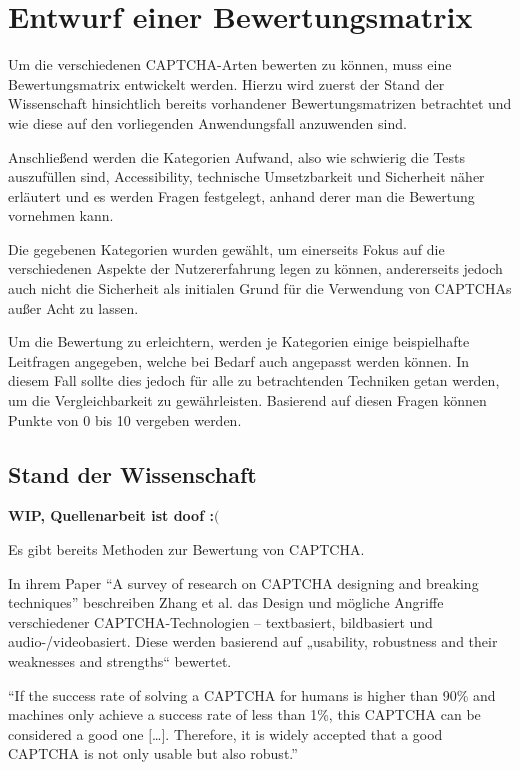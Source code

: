 \chapter{Entwurf einer Bewertungsmatrix}
\label{ch:matrix}

Um die verschiedenen CAPTCHA-Arten bewerten zu können, muss eine Bewertungsmatrix entwickelt werden.
Hierzu wird zuerst der Stand der Wissenschaft hinsichtlich bereits vorhandener Bewertungsmatrizen betrachtet
und wie diese auf den vorliegenden Anwendungsfall anzuwenden sind.

Anschließend werden die Kategorien Aufwand, also wie schwierig die Tests auszufüllen sind, Accessibility, technische Umsetzbarkeit
und Sicherheit näher erläutert und es werden Fragen festgelegt, anhand derer man die Bewertung vornehmen kann.

Die gegebenen Kategorien wurden gewählt, um einerseits Fokus auf die verschiedenen Aspekte der Nutzererfahrung legen zu können,
andererseits jedoch auch nicht die Sicherheit als initialen Grund für die Verwendung von CAPTCHAs außer Acht zu lassen.

Um die Bewertung zu erleichtern, werden je Kategorien einige beispielhafte Leitfragen angegeben, welche bei Bedarf auch angepasst werden können.
In diesem Fall sollte dies jedoch für alle zu betrachtenden Techniken getan werden, um die Vergleichbarkeit zu gewährleisten.
Basierend auf diesen Fragen können Punkte von 0 bis 10 vergeben werden.

\section{Stand der Wissenschaft}
\label{ch:matrix:sdw}

\textbf{WIP, Quellenarbeit ist doof :$($}

Es gibt bereits Methoden zur Bewertung von CAPTCHA.

In ihrem Paper ``A survey of research on CAPTCHA designing and breaking techniques'' beschreiben Zhang et al. das Design
und mögliche Angriffe verschiedener CAPTCHA-Technologien – textbasiert, bildbasiert und audio-/videobasiert.
Diese werden basierend auf „usability, robustness and their weaknesses and strengths“ bewertet.  \cite[p.75]{surveyofresearch}

``If the success rate of solving a CAPTCHA for humans is higher than 90\% and machines only achieve
a success rate of less than 1\%, this CAPTCHA can be considered a good one $[$\dots$]$.
Therefore, it is widely accepted that a good CAPTCHA is not only usable but also robust.'' \cite[p.75]{surveyofresearch}

